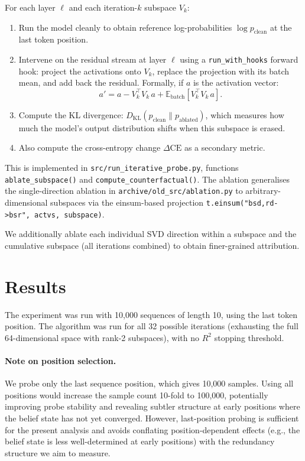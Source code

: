 \documentclass[11pt]{article}
\newcommand{\code}[1]{\texttt{#1}}
\begin{document}
For each layer $\ell$ and each iteration-$k$ subspace $V_k$:
\begin{enumerate}
  \item Run the model cleanly to obtain reference log-probabilities $\log p_{\text{clean}}$ at the last token position.
  \item Intervene on the residual stream at layer $\ell$ using a \code{run\_with\_hooks} forward hook: project the activations onto $V_k$, replace the projection with its batch mean, and add back the residual.  Formally, if $a$ is the activation vector:
  \begin{equation}
    a' = a - V_k^\top V_k \, a + \mathbb{E}_{\text{batch}}[V_k^\top V_k \, a].
  \end{equation}
  \item Compute the KL divergence: $D_{\text{KL}}(p_{\text{clean}} \| p_{\text{ablated}})$, which measures how much the model's output distribution shifts when this subspace is erased.
  \item Also compute the cross-entropy change $\Delta\text{CE}$ as a secondary metric.
\end{enumerate}

This is implemented in \code{src/run\_iterative\_probe.py}, functions \code{ablate\_subspace()} and \code{compute\_counterfactual()}.  The ablation generalises the single-direction ablation in \code{archive/old\_src/ablation.py} to arbitrary-dimensional subspaces via the einsum-based projection \code{t.einsum("bsd,rd->bsr", actvs, subspace)}.

We additionally ablate each individual SVD direction within a subspace and the cumulative subspace (all iterations combined) to obtain finer-grained attribution.

\section{Results}
\label{sec:results}

The experiment was run with 10{,}000 sequences of length 10, using the last token position.  The algorithm was run for all 32 possible iterations (exhausting the full 64-dimensional space with rank-2 subspaces), with no $R^2$ stopping threshold.

\paragraph{Note on position selection.}
We probe only the last sequence position, which gives 10{,}000 samples.  Using all positions would increase the sample count 10-fold to 100{,}000, potentially improving probe stability and revealing subtler structure at early positions where the belief state has not yet converged.  However, last-position probing is sufficient for the present analysis and avoids conflating position-dependent effects (e.g., the belief state is less well-determined at early positions) with the redundancy structure we aim to measure.
\end{document}
